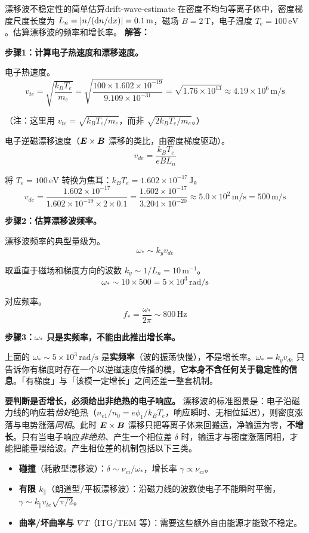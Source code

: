 \begin{example}{漂移波不稳定性的简单估算}{drift-wave-estimate}
在密度不均匀等离子体中，密度梯度尺度长度为 $L_n = |n/(\mathrm{d} n/\mathrm{d} x)| = 0.1\,\mathrm{m}$，磁场 $B = 2\,\mathrm{T}$，电子温度 $T_e = 100\,\mathrm{eV}$。估算漂移波的频率和增长率。
\tcblower
\textbf{解答：}

\textbf{步骤1：计算电子热速度和漂移速度。}

电子热速度。
\[
v_{te} = \sqrt{\frac{k_{\!B}T_e}{m_e}} = \sqrt{\frac{100\times 1.602\times 10^{-19}}{9.109\times 10^{-31}}}
= \sqrt{1.76\times 10^{13}} \approx 4.19\times 10^{6}\,\mathrm{m/s}
\]

（注：这里用 $v_{te} = \sqrt{k_{\!B}T_e/m_e}$，而非 $\sqrt{2k_{\!B}T_e/m_e}$。）

电子逆磁漂移速度（$\bm{E}\times\bm{B}$ 漂移的类比，由密度梯度驱动）。
\[
v_{de} = \frac{k_{\!B}T_e}{eBL_n}
\]

将 $T_e = 100\,\mathrm{eV}$ 转换为焦耳：$k_{\!B}T_e = 1.602\times 10^{-17}\,\mathrm{J}$。
\[
v_{de} = \frac{1.602\times 10^{-17}}{1.602\times 10^{-19}\times 2\times 0.1}
= \frac{1.602\times 10^{-17}}{3.204\times 10^{-20}}
\approx 5.0\times 10^{2}\,\mathrm{m/s} = 500\,\mathrm{m/s}
\]

\textbf{步骤2：估算漂移波频率。}

漂移波频率的典型量级为。
\[
\omega_* \sim k_y v_{de}
\]

取垂直于磁场和梯度方向的波数 $k_y \sim 1/L_n = 10\,\mathrm{m}^{-1}$。
\[
\omega_* \sim 10\times 500 = 5\times 10^{3}\,\mathrm{rad/s}
\]

对应频率。
\[
f_* = \frac{\omega_*}{2\pi} \sim 800\,\mathrm{Hz}
\]

\textbf{步骤3：$\omega_*$ 只是实频率，不能由此推出增长率。}

上面的 $\omega_*\sim5\times10^{3}\,\mathrm{rad/s}$ 是\textbf{实频率}（波的振荡快慢），\textbf{不}是增长率。$\omega_*=k_yv_{de}$ 只告诉你有梯度时存在一个以逆磁速度传播的模，\textbf{它本身不含任何关于稳定性的信息}。「有梯度」与「该模一定增长」之间还差一整套机制。

\textbf{要判断是否增长，必须给出非绝热的电子响应。} 漂移波的标准图景是：电子沿磁力线的响应若\emph{恰好}绝热（$n_{e1}/n_0=e\phi_1/k_BT_e$，响应瞬时、无相位延迟），则密度涨落与电势涨落\emph{同相}。此时 $\bm{E}\times\bm{B}$ 漂移只把等离子体来回搬运，净输运为零，\textbf{不增长}。只有当电子响应\emph{非绝热}、产生一个相位差 $\delta$ 时，输运才与密度涨落同相，才能把能量喂给波。产生相位差的机制包括以下三类。
\begin{itemize}[leftmargin=*,itemsep=0pt]
\item \textbf{碰撞}（耗散型漂移波）：$\delta\sim\nu_{ei}/\omega_*$，增长率 $\gamma\propto\nu_{ei}$。
\item \textbf{有限 $k_\parallel$}（朗道型/平板漂移波）：沿磁力线的波数使电子不能瞬时平衡，$\gamma\sim k_\parallel v_{te}\sqrt{\pi/2}$。
\item \textbf{曲率/坏曲率与 $\nabla T$}（ITG/TEM 等）：需要这些额外自由能源才能致不稳定。
\end{itemize}


\end{example}
